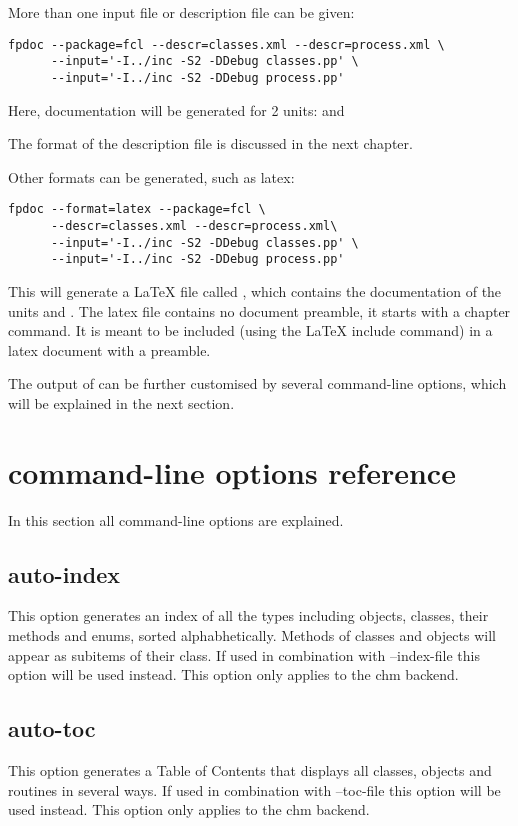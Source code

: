 More than one input file or description file can be given:
\begin{verbatim}
fpdoc --package=fcl --descr=classes.xml --descr=process.xml \
      --input='-I../inc -S2 -DDebug classes.pp' \
      --input='-I../inc -S2 -DDebug process.pp'
\end{verbatim}
Here, documentation will be generated for 2 units: 
and 

The format of the description file is discussed in the next chapter.

Other formats can be generated, such as latex:
\begin{verbatim}
fpdoc --format=latex --package=fcl \
      --descr=classes.xml --descr=process.xml\
      --input='-I../inc -S2 -DDebug classes.pp' \
      --input='-I../inc -S2 -DDebug process.pp'
\end{verbatim}
This will generate a LaTeX file called , which contains the
documentation of the units \file{classes} and . The latex file
contains no document preamble, it starts with a chapter command. 
It is meant to be included (using the LaTeX include command) in a latex 
document with a preamble.

The output of \fpdoc can be further customised by several command-line
options, which will be explained in the next section.

\section{\fpdoc command-line options reference}
In this section all \fpdoc command-line options are explained.

\subsection{auto-index}
This option generates an index of all the types including objects, 
classes, their methods and enums, sorted alphabhetically. Methods 
of classes and objects will appear as subitems of their class. If used
in combination with --index-file this option will be used instead. 
This option only applies to the chm backend.

\subsection{auto-toc}
This option generates a Table of Contents that displays all classes,
objects and routines in several ways. If used in combination with
--toc-file this option will be used instead. This option only applies 
to the chm backend.

